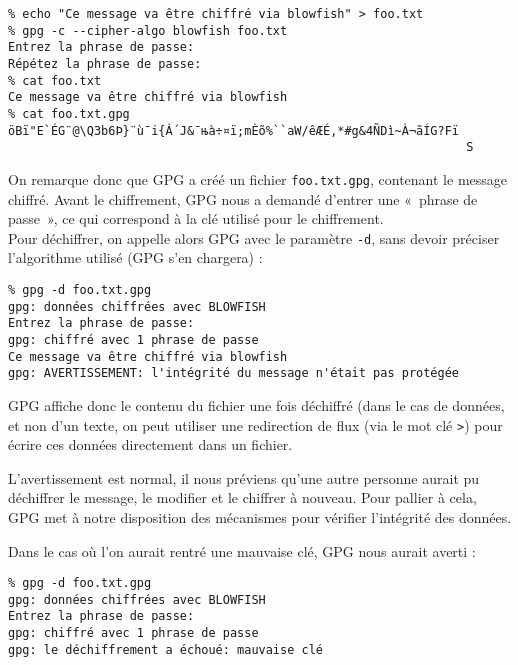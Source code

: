 \begin{lstlisting}
% echo "Ce message va être chiffré via blowfish" > foo.txt
% gpg -c --cipher-algo blowfish foo.txt
Entrez la phrase de passe: 
Répétez la phrase de passe: 
% cat foo.txt
Ce message va être chiffré via blowfish
% cat foo.txt.gpg
öBï"E`ÉG­¨@\Q3b6Þ}¨ù¯i{Á´J&¯њà÷¤ï;mÈõ%``aW/êÆÉ,*#g&4ÑDì~À¬ãÍG?Fï
                                                                S
\end{lstlisting}

On remarque donc que GPG a créé un fichier \texttt{foo.txt.gpg},
contenant le message chiffré. Avant le chiffrement, GPG nous a
demandé d'entrer une «~phrase de passe~», ce qui correspond à la
clé utilisé pour le chiffrement.
\\

Pour déchiffrer, on appelle alors GPG avec le paramètre
\texttt{-d}, sans devoir préciser l'algorithme utilisé (GPG s'en
chargera) : 

\begin{lstlisting}
% gpg -d foo.txt.gpg 
gpg: données chiffrées avec BLOWFISH
Entrez la phrase de passe: 
gpg: chiffré avec 1 phrase de passe
Ce message va être chiffré via blowfish
gpg: AVERTISSEMENT: l'intégrité du message n'était pas protégée
\end{lstlisting}

GPG affiche donc le contenu du fichier une fois déchiffré (dans le
cas de données, et non d'un texte, on peut utiliser une
redirection de flux (via le mot clé \texttt{>}) pour écrire ces 
données directement dans un fichier.

L'avertissement est normal, il nous préviens qu'une autre personne
aurait pu déchiffrer le message, le modifier et le chiffrer à
nouveau. Pour pallier à cela, GPG met à notre disposition des
mécanismes pour vérifier l'intégrité des données. 

Dans le cas où l'on aurait rentré une mauvaise clé, GPG nous
aurait averti : 
\begin{lstlisting}
% gpg -d foo.txt.gpg
gpg: données chiffrées avec BLOWFISH
Entrez la phrase de passe:
gpg: chiffré avec 1 phrase de passe
gpg: le déchiffrement a échoué: mauvaise clé
\end{lstlisting}

